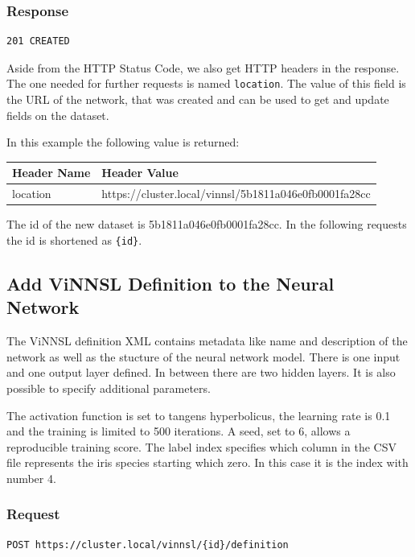 \subsubsection{Response}\label{response}

\begin{verbatim}
201 CREATED 
\end{verbatim}

Aside from the HTTP Status Code, we also get HTTP headers in the
response. The one needed for further requests is named
\texttt{location}. The value of this field is the URL of the network,
that was created and can be used to get and update fields on the
dataset.

In this example the following value is returned:

\begin{longtable}[]{@{}ll@{}}
\toprule
Header Name & Header Value\tabularnewline
\midrule
\endhead
location &
https://cluster.local/vinnsl/5b1811a046e0fb0001fa28cc\tabularnewline
\bottomrule
\end{longtable}

The id of the new dataset is 5b1811a046e0fb0001fa28cc. In the following
requests the id is shortened as \texttt{\{id\}}.

\subsection{Add ViNNSL Definition to the Neural
Network}\label{add-vinnsl-definition-to-the-neural-network}

The ViNNSL definition XML contains metadata like name and description of
the network as well as the stucture of the neural network model. There
is one input and one output layer defined. In between there are two
hidden layers. It is also possible to specify additional parameters.

The activation function is set to tangens hyperbolicus, the learning
rate is 0.1 and the training is limited to 500 iterations. A seed, set
to 6, allows a reproducible training score. The label index specifies
which column in the CSV file represents the iris species starting which
zero. In this case it is the index with number 4.

\subsubsection{Request}\label{request-1}

\begin{verbatim}
POST https://cluster.local/vinnsl/{id}/definition
\end{verbatim}


